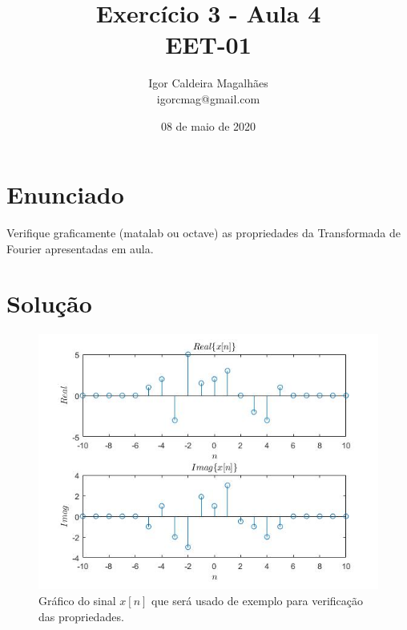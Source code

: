 \documentclass[a4paper, 12pt]{article}
\title{Exercício 3 - Aula 4 \\ EET-01}
\author{
  Igor Caldeira Magalhães\\igorcmag@gmail.com
}
\date{08 de maio de 2020}
\begin{document}
\maketitle
\section{Enunciado}

Verifique graficamente (matalab ou octave) as propriedades da Transformada de Fourier apresentadas em aula.


\section{Solução}



\begin{figure}[H]
	\centering
	\includegraphics[scale=0.7]{img1.jpg} 
	\caption{Gráfico do sinal $x[n]$ que será usado de exemplo para verificação das propriedades.}
	\label{fig:1}
\end{figure}
\end{document}
